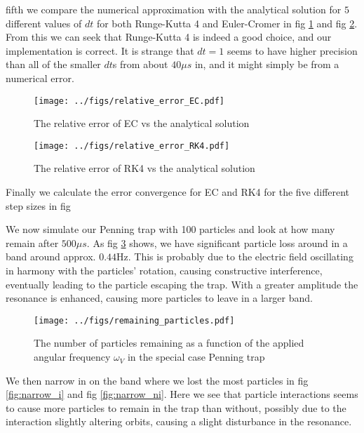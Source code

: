 \documentclass[english,notitlepage,reprint,nofootinbib]{revtex4-1}  %
\begin{document}
fifth we compare the numerical approximation with the analytical solution for $5$ different values of $dt$ for both Runge-Kutta 4 and Euler-Cromer in fig \ref{fig:rel_ec} and fig \ref{fig:rel_rk4}. From this we can seek that Runge-Kutta 4 is indeed a good choice, and our implementation is correct. It is strange that $dt=1$ seems to have higher precision than all of the smaller $dt$s from about $40 \mu s$ in, and it might simply be from a numerical error.

\begin{figure}[h!]
	\centering
	\texttt{[image: ../figs/relative\_error\_EC.pdf]} %
	\caption{The relative error of EC vs the analytical solution}
	\label{fig:rel_ec}
\end{figure}

\begin{figure}[h!]
	\centering
	\texttt{[image: ../figs/relative\_error\_RK4.pdf]} %
	\caption{The relative error of RK4 vs the analytical solution}
	\label{fig:rel_rk4}
\end{figure}

Finally we calculate the error convergence for EC and RK4 for the five different step sizes in fig


We now simulate our Penning trap with 100 particles and look at how many remain after $500 \mu s$. As fig \ref{fig:part_remain} shows, we have significant particle loss around in a band around approx. $0.44$Hz. This is probably due to the electric field oscillating in harmony with the particles' rotation, causing constructive interference, eventually leading to the particle escaping the trap. With a greater amplitude the resonance is enhanced, causing more particles to leave in a larger band.

\begin{figure}[h!]
	\centering
	\texttt{[image: ../figs/remaining\_particles.pdf]} %
	\caption{The number of particles remaining as a function of the applied angular frequency $\omega_V$ in the special case Penning trap}
	\label{fig:part_remain}
\end{figure}

We then narrow in on the band where we lost the most particles in fig \ref{fig:narrow_i} and fig \ref{fig:narrow_ni}. Here we see that particle interactions seems to cause more particles to remain in the trap than without, possibly due to the interaction slightly altering orbits, causing a slight disturbance in the resonance.
\end{document}
